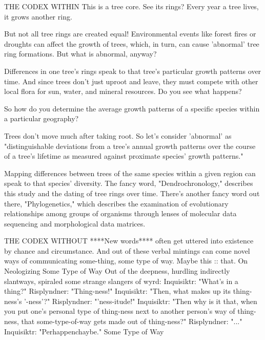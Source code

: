 THE CODEX WITHIN
This is a tree core. See its rings? Every year a tree lives, it grows another ring.

But not all tree rings are created equal! Environmental events like forest fires or droughts can affect the growth of trees, which, in turn, can cause 'abnormal' tree ring formations. But what is abnormal, anyway?

Differences in one tree's rings speak to that tree's particular growth patterns over time. And since trees don't just uproot and leave, they must compete with other local flora for sun, water, and mineral resources. Do you see what happens?

So how do you determine the average growth patterns of a specific species within a particular geography?

Trees don't move much after taking root. So let's consider 'abnormal' as "distinguishable deviations from a tree's annual growth patterns over the course of a tree's lifetime as measured against proximate species' growth patterns."

Mapping differences between trees of the same species within a given region can speak to that species' diversity. The fancy word, "Dendrochronology," describes this study and the dating of tree rings over time.
There's another fancy word out there, "Phylogenetics," which describes the examination of evolutionary relationships among groups of organisms through lenses of molecular data sequencing and morphological data matrices.

THE CODEX WITHOUT
****New words**** often get uttered into existence by chance and circumstance. And out of these verbal mintings can come novel ways of communicating some-thing, some type of way. Maybe this :: that.
On Neologizing Some Type of Way
Out of the deepness, hurdling indirectly slantways, spiraled some strange slangers of wyrd:
Inquisiktr: "What's in a thing?"
Risplyndner: "Thing-ness!"
Inquisiktr: "Then, what makes up its thing-ness's '-ness'?"
Risplyndner: "'ness-itude!"
Inquisiktr: "Then why is it that, when you put one's personal type of thing-ness next to another person's way of thing-ness, that some-type-of-way gets made out of thing-ness?"
Risplyndner: "..."
Inquisiktr: "Perhappenchaybe."
Some Type of Way





